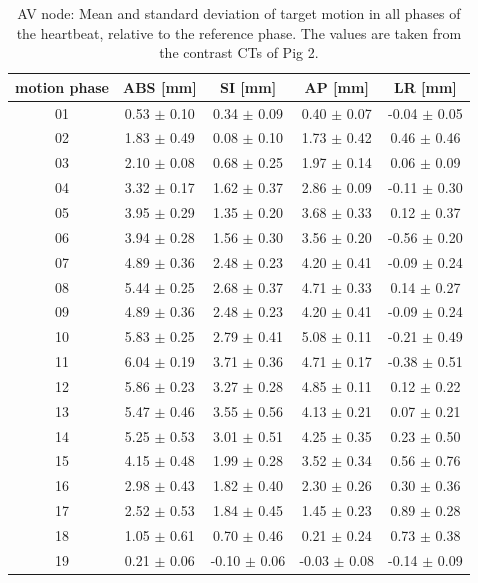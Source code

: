 \documentclass[type=dr, dr=rernat, accentcolor=tud7b,colorbacktitle, bigchapter, openright, twoside, 12pt ]{tudthesis}
\begin{document}
\begin{table}[H]
  \centering
  \scriptsize
  \caption{AV node: Mean and standard deviation of target motion in all phases of the heartbeat, relative to the reference phase. The values are 
  taken from the contrast CTs of Pig 2.}
  \begin{tabular}{|c|c|c|c|c|}
    \hline\hline
    motion phase\rule{0pt}{2.6ex}\rule[-1.2ex]{0pt}{0pt} & ABS [mm] & SI [mm] & AP [mm] & LR [mm]\\
    \hline
01 &0.53 $\pm$ 0.10 &0.34 $\pm$ 0.09 &0.40 $\pm$ 0.07 &-0.04 $\pm$ 0.05 \\
02 &1.83 $\pm$ 0.49 &0.08 $\pm$ 0.10 &1.73 $\pm$ 0.42 &0.46 $\pm$ 0.46 \\
03 &2.10 $\pm$ 0.08 &0.68 $\pm$ 0.25 &1.97 $\pm$ 0.14 &0.06 $\pm$ 0.09 \\
04 &3.32 $\pm$ 0.17 &1.62 $\pm$ 0.37 &2.86 $\pm$ 0.09 &-0.11 $\pm$ 0.30 \\
05 &3.95 $\pm$ 0.29 &1.35 $\pm$ 0.20 &3.68 $\pm$ 0.33 &0.12 $\pm$ 0.37 \\
06 &3.94 $\pm$ 0.28 &1.56 $\pm$ 0.30 &3.56 $\pm$ 0.20 &-0.56 $\pm$ 0.20 \\
07 &4.89 $\pm$ 0.36 &2.48 $\pm$ 0.23 &4.20 $\pm$ 0.41 &-0.09 $\pm$ 0.24 \\
08 &5.44 $\pm$ 0.25 &2.68 $\pm$ 0.37 &4.71 $\pm$ 0.33 &0.14 $\pm$ 0.27 \\
09 &4.89 $\pm$ 0.36 &2.48 $\pm$ 0.23 &4.20 $\pm$ 0.41 &-0.09 $\pm$ 0.24 \\
10 &5.83 $\pm$ 0.25 &2.79 $\pm$ 0.41 &5.08 $\pm$ 0.11 &-0.21 $\pm$ 0.49 \\
11 &6.04 $\pm$ 0.19 &3.71 $\pm$ 0.36 &4.71 $\pm$ 0.17 &-0.38 $\pm$ 0.51 \\
12 &5.86 $\pm$ 0.23 &3.27 $\pm$ 0.28 &4.85 $\pm$ 0.11 &0.12 $\pm$ 0.22 \\
13 &5.47 $\pm$ 0.46 &3.55 $\pm$ 0.56 &4.13 $\pm$ 0.21 &0.07 $\pm$ 0.21 \\
14 &5.25 $\pm$ 0.53 &3.01 $\pm$ 0.51 &4.25 $\pm$ 0.35 &0.23 $\pm$ 0.50 \\
15 &4.15 $\pm$ 0.48 &1.99 $\pm$ 0.28 &3.52 $\pm$ 0.34 &0.56 $\pm$ 0.76 \\
16 &2.98 $\pm$ 0.43 &1.82 $\pm$ 0.40 &2.30 $\pm$ 0.26 &0.30 $\pm$ 0.36 \\
17 &2.52 $\pm$ 0.53 &1.84 $\pm$ 0.45 &1.45 $\pm$ 0.23 &0.89 $\pm$ 0.28 \\
18 &1.05 $\pm$ 0.61 &0.70 $\pm$ 0.46 &0.21 $\pm$ 0.24 &0.73 $\pm$ 0.38 \\
19 &0.21 $\pm$ 0.06 &-0.10 $\pm$ 0.06 &-0.03 $\pm$ 0.08 &-0.14 $\pm$ 0.09 \\
    \hline\hline
  \end{tabular}
  \label{tab:motion:AV:Pig2}
\end{table}
\end{document}
